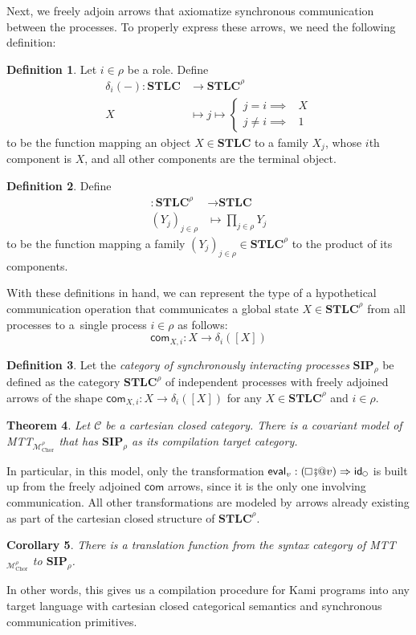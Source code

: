 \documentclass{scrartcl}
\renewcommand{\circle}{\mathop{\mathchoice%
  {\tikz{\draw (0,0) circle [radius=0.1cm];}}%
  {\tikz{\draw (0,0) circle [radius=0.1cm];}}%
  {\tikz{\draw (0,0) circle [radius=0.075cm];}}%
  {\tikz{\draw (0,0) circle [radius=0.05cm];}}}}
\renewcommand{\square}{\mathop{\mathchoice%
  {\tikz{\draw (0,0) rectangle (0.2cm,0.2cm);}}%
  {\tikz{\draw (0,0) rectangle (0.2cm,0.2cm);}}%
  {\tikz{\draw (0,0) rectangle (0.15cm,0.15cm);}}%
  {\tikz{\draw (0,0) rectangle (0.10cm,0.10cm);}}}}
\theoremstyle{definition}
\newtheorem{definition}{Definition}
\theoremstyle{plain}
\newtheorem{theorem}[definition]{Theorem}
\newtheorem{corollary}[definition]{Corollary}
\begin{document}
Next, we freely adjoin arrows that axiomatize synchronous communication between
the processes. To properly express these arrows, we need the following
definition:
\begin{definition}
  Let $i\in\rho$ be a role. Define
  \begin{align*}
    \delta_i({-}) : \textbf{STLC} &\to \textbf{STLC}^\rho \\
    X &\mapsto j \mapsto
    \begin{cases}
      j = i \implies &X\\
      j \neq i \implies &1
    \end{cases}
  \end{align*}
  to be the function mapping an object $X \in \textbf{STLC}$ to a family
  $X_j$, whose $i$th component is $X$, and all other components are the
  terminal object.
\end{definition}
\begin{definition} Define
  \begin{align*}
    [{-}] : \textbf{STLC}^\rho &\to \textbf{STLC} \\
    (Y_j)_{j\in\rho} &\mapsto \prod_{j \in \rho} Y_j
  \end{align*}
  to be the function mapping a family $(Y_j)_{j\in\rho} \in \textbf{STLC}^\rho$
  to the product of its components.
\end{definition}
With these definitions in hand, we can represent the type of a hypothetical
communication operation that communicates a global state $X \in
\textbf{STLC}^\rho$ from all processes to a~single process $i \in \rho$ as
follows:
\[
  \textsf{com}_{X,i} : X \to \delta_i([X])
\]
\begin{definition}
  Let the \emph{category of synchronously interacting processes}
  $\textbf{SIP}_{\rho}$ be
  defined as the category $\textbf{STLC}^\rho$ of independent processes with
  freely adjoined arrows of the shape $\textsf{com}_{X,i} : X \to
  \delta_i([X])$ for any $X \in \textbf{STLC}^\rho$ and $i \in \rho$.
\end{definition}
\begin{theorem}
  Let {\upshape$\mathcal{C}$} be a cartesian closed category. There is a
  covariant model of {\upshape MTT${}_{\mathcal{M}^\rho_{\textrm{Chor}}}$} that
  has {\upshape$\textbf{SIP}_{\rho}$} as its compilation target category.
\end{theorem}
In particular, in this model, only the transformation $\textsf{eval}_v :
(\square \fatsemi @v) \Rightarrow \textsf{id}_{\circle}$ is built up from the
freely adjoined $\textsf{com}$ arrows, since it is the only one involving
communication. All other transformations are modeled by arrows already existing
as part of the cartesian closed structure of $\textbf{STLC}^\rho$.
\begin{corollary}
  There is a translation function from the syntax category of
  {\upshape MTT${}_{\mathcal{M}^\rho_{\textrm{Chor}}}$} to
  {\upshape$\textbf{SIP}_{\rho}$}.
\end{corollary}
In other words, this gives us a compilation procedure for Kami programs into
any target language with cartesian closed categorical semantics and synchronous
communication primitives.
\end{document}

